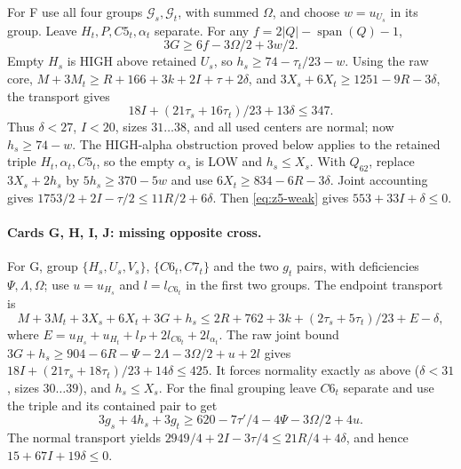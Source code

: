 \documentclass[11pt,letterpaper]{article}
\theoremstyle{definition}\newtheorem{definition}[theorem]{Definition}
\begin{document}
For F use all four groups $\mathcal G_s,\mathcal G_t$, with summed
$\Omega$, and choose $w=u_{U_s}$ in its group. Leave
$H_t,P,C5_t,\alpha_t$ separate. For any $f=2|Q|-\operatorname{span}(Q)-1$,
\[
 3G\ge6f-3\Omega/2+3w/2.
\]
Empty $H_s$ is HIGH above retained $U_s$, so
$h_s\ge74-\tau_t/23-w$. Using the raw core,
$M+3M_t\ge R+166+3k+2I+\tau+2\delta$, and
$3X_s+6X_t\ge1251-9R-3\delta$, the transport gives
\[
 18I+(21\tau_s+16\tau_t)/23+13\delta\le347.
\]
Thus $\delta<27$, $I<20$, sizes $31\ldots38$, and all used centers
are normal; now $h_s\ge74-w$.
The HIGH-alpha obstruction proved below applies to the retained triple
$H_t,\alpha_t,C5_t$, so the empty $\alpha_s$ is LOW and $h_s\le X_s$.
With $Q_{62}$, replace $3X_s+2h_s$ by $5h_s\ge370-5w$ and use
$6X_t\ge834-6R-3\delta$. Joint accounting gives
$1753/2+2I-\tau/2\le11R/2+6\delta$.
Then \eqref{eq:z5-weak} gives $553+33I+\delta\le0$.

\paragraph{Cards G, H, I, J: missing opposite cross.}
For G, group $\{H_s,U_s,V_s\}$, $\{C6_t,C7_t\}$ and the two
$g_t$ pairs, with deficiencies $\Psi,\Lambda,\Omega$; use
$u=u_{H_s}$ and $l=l_{C6_t}$ in the first two groups.
The endpoint transport is
\[
 M+3M_t+3X_s+6X_t+3G+h_s
 \le2R+762+3k+(2\tau_s+5\tau_t)/23+E-\delta,
\]
where $E=u_{H_s}+u_{H_t}+l_P+2l_{C6_t}+2l_{\alpha_t}$.
The raw joint bound
$3G+h_s\ge904-6R-\Psi-2\Lambda-3\Omega/2+u+2l$
gives $18I+(21\tau_s+18\tau_t)/23+14\delta\le425$.
It forces normality exactly as above ($\delta<31$, sizes $30\ldots39$),
and $h_s\le X_s$. For the final grouping leave $C6_t$ separate and
use the triple and its contained pair to get
\[
 3g_s+4h_s+3g_t\ge620-7\tau'/4-4\Psi-3\Omega/2+4u.
\]
The normal transport yields $2949/4+2I-3\tau/4\le21R/4+4\delta$,
and hence $15+67I+19\delta\le0$.
\end{document}
